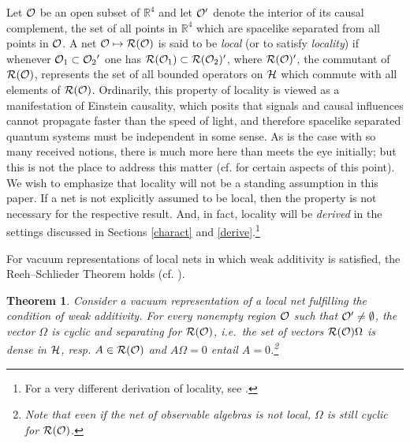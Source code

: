 \documentclass[12pt]{article}
\newtheorem{theorem}{Theorem}[section]
\newcommand{\ie}{{\it i.e.\ }}
\def\Hs{{\cal H}}
\def\Os{{\cal O}}
\def\Rs{{\cal R}}
\def\RR{{\mathbb R}}
\begin{document}
     Let $\Os$ be an open subset of $\RR^4$ and let $\Os'$ denote
the interior of its causal complement, the set of all points 
in $\RR^4$ which are spacelike separated from all points in $\Os$.
A net $\Os \mapsto \Rs(\Os)$ is said to be {\it local} (or to satisfy
{\it locality}) if whenever
$\Os_1 \subset \Os_2{}'$ one has $\Rs(\Os_1) \subset \Rs(\Os_2)'$,
where $\Rs(\Os)'$, the commutant of $\Rs(\Os)$, represents the set
of all bounded operators on $\Hs$ which commute with all elements
of $\Rs(\Os)$. Ordinarily, this property of locality is viewed
as a manifestation of Einstein causality, which posits that signals 
and causal influences cannot propagate faster than the speed of light,
and therefore spacelike separated quantum systems must be independent
in some sense. As is the case with so many received notions, there
is much more here than meets the eye initially; but this is not
the place to address this matter (cf. \cite{But,Su2,Susub} for certain 
aspects of this point). We wish to emphasize that locality
will not be a standing assumption in this paper. If a net is
not explicitly assumed to be local, then the property is not necessary
for the respective result. And, in fact, locality will be {\it derived}
in the settings discussed in Sections \ref{charact} and 
\ref{derive}.\footnote{For a very different derivation of locality, 
see \cite{BS5}.} 

     For vacuum representations of local nets in which weak additivity
is satisfied, the Reeh--Schlieder Theorem holds (cf. 
\cite{BLT,Haag,Ar,Jo,StWi}).

\begin{theorem} \label{R-S} 
Consider a vacuum representation of a local net fulfilling the condition
of weak additivity. For every nonempty region $\Os$ such that 
$\Os' \neq \emptyset$, the vector $\Omega$ is cyclic and separating for 
$\Rs(\Os)$, \ie the set of vectors $\Rs(\Os)\Omega$ is dense in $\Hs$, resp. 
$A \in \Rs(\Os)$ and $A\Omega = 0$ entail $A = 0$.\footnote{Note that
even if the net of observable algebras is not local, $\Omega$ is still
cyclic for $\Rs(\Os)$.} 
\end{theorem}
\end{document}
